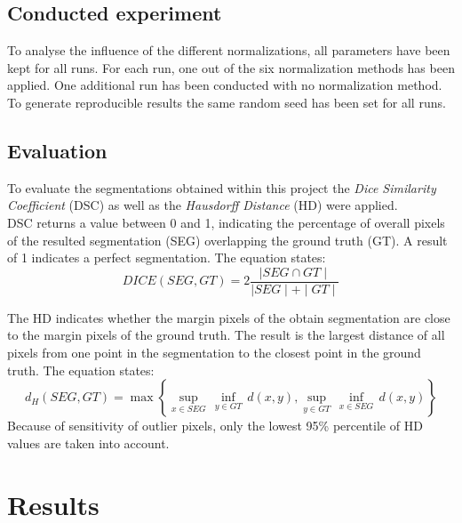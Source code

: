 \documentclass[journal]{IEEEtran}
\begin{document}
	
\subsection{Conducted experiment}
	To analyse the influence of the different normalizations, all parameters have been kept for all runs. 
	For each run, one out of the six normalization methods has been applied. One additional run has been conducted with no normalization method.
	To generate reproducible results the same random seed has been set for all runs.  
	
\subsection{Evaluation}
	To evaluate the segmentations obtained within this project the {\itshape Dice Similarity Coefficient} (DSC) as well as the {\itshape Hausdorff Distance} (HD) were applied.\\
	DSC returns a value between 0 and 1, indicating the percentage of overall pixels of the resulted segmentation (SEG) overlapping the ground truth (GT). 
	A result of 1 indicates a perfect segmentation. The equation states: 
	\begin{equation}
		DICE(SEG, GT) = 2 \frac{\mid SEG \cap GT \mid}{\mid SEG \mid + \mid GT \mid}
	\end{equation}

	The HD indicates whether the margin pixels of the obtain segmentation are close to the margin pixels of the ground truth. 
	The result is the largest distance of all pixels from one point in the segmentation to the closest point in the ground truth.
	The equation states:
	\begin{equation}
		d_H (SEG, GT) = \max \left\{ \underset{x\in SEG}{\mathop{\sup }}\,\underset{y\in GT}{\mathop{\inf }}\,d(x,y),\underset{y\in GT}{\mathop{\sup }}\,\underset{x\in SEG}{\mathop{\inf }}\,d(x,y) \right\}
	\end{equation}
	Because of sensitivity of outlier pixels, only the lowest 95\% percentile of HD values are taken into account.

	


\section{Results}
\end{document}
